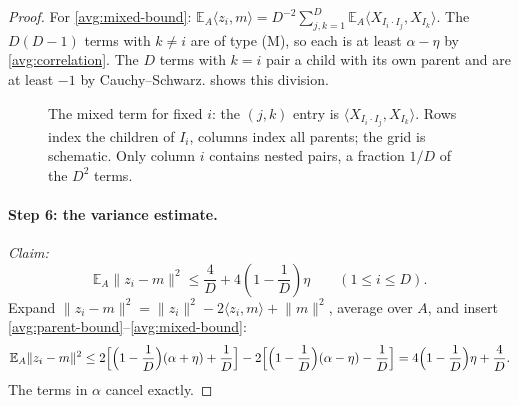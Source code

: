 \documentclass[11pt]{article}
\newcommand{\norm}[1]{\lVert #1\rVert}
\newcommand{\ip}[2]{\langle #1,#2\rangle}
\theoremstyle{definition}
\numberwithin{equation}{section}
\begin{document}
\begin{proof}
For \eqref{avg:mixed-bound}:
\(\mathbb E_A\ip{z_i}{m}=D^{-2}\sum_{j,k=1}^D
\mathbb E_A\ip{X_{I_i\cdot I_j}}{X_{I_k}}\). The \(D(D-1)\) terms with
\(k\ne i\) are of type (M), so each is at least \(\alpha-\eta\) by
\eqref{avg:correlation}. The \(D\) terms with \(k=i\) pair a child with its
own parent and are at least \(-1\) by Cauchy--Schwarz.
 shows this division.
\begin{figure}[tbp]
\centering
{}
\caption{The mixed term for fixed \(i\): the \((j,k)\) entry is
\(\ip{X_{I_i\cdot I_j}}{X_{I_k}}\). Rows index the children of \(I_i\),
columns index all parents; the grid is schematic. Only column \(i\) contains
nested pairs, a fraction \(1/D\) of the \(D^2\) terms.}
\label{fig:mixed-pairs}
\end{figure}

\paragraph{Step 6: the variance estimate.}
\emph{Claim:}
\begin{equation}\label{avg:variance}
  \mathbb E_A\norm{z_i-m}^2
    \leq\frac4D+4\left(1-\frac1D\right)\eta
    \qquad(1\leq i\leq D).
\end{equation}
Expand \(\norm{z_i-m}^2=\norm{z_i}^2-2\ip{z_i}{m}+\norm{m}^2\), average over
\(A\), and insert \eqref{avg:parent-bound}--\eqref{avg:mixed-bound}:
\[
 \mathbb E_A\norm{z_i-m}^2
 \le2\Bigl[\Bigl(1-\frac1D\Bigr)(\alpha+\eta)+\frac1D\Bigr]
   -2\Bigl[\Bigl(1-\frac1D\Bigr)(\alpha-\eta)-\frac1D\Bigr]
 =4\Bigl(1-\frac1D\Bigr)\eta+\frac4D .
\]
The terms in \(\alpha\) cancel exactly.


\end{proof}
\end{document}
